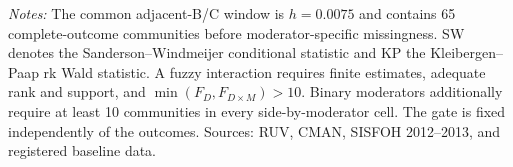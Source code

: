 \begin{table}[!htbp]
\centering
\caption{Local support and fuzzy-heterogeneity instrument diagnostics}
\label{tab:hte-2013-ccpp-diagnostics}
\small
{}
\parbox{0.97\linewidth}{\footnotesize \textit{Notes:} The common adjacent-B/C window is \(h=0.0075\) and contains 65 complete-outcome communities before moderator-specific missingness. SW denotes the Sanderson--Windmeijer conditional statistic and KP the Kleibergen--Paap rk Wald statistic. A fuzzy interaction requires finite estimates, adequate rank and support, and \(\min(F_D,F_{D\times M})>10\). Binary moderators additionally require at least 10 communities in every side-by-moderator cell. The gate is fixed independently of the outcomes. Sources: RUV, CMAN, SISFOH 2012--2013, and registered baseline data.}
\end{table}
